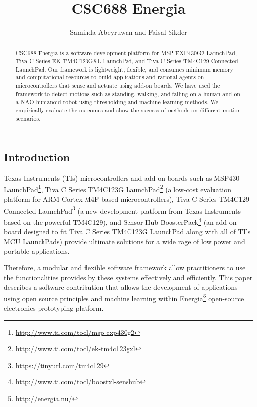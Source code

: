 \documentclass{llncs}
\begin{document}
\begin{sloppy}
\title{CSC688 Energia}
\author{Saminda Abeyruwan and Faisal Sikder}

\maketitle

\begin{abstract}
CSC688 Energia is a software development platform for MSP-EXP430G2 LaunchPad, Tiva C Series
EK-TM4C123GXL LaunchPad, and Tiva C Series TM4C129 Connected LaunchPad. Our framework is
lightweight, flexible, and consumes minimum memory and computational resources to build
applications and rational agents on microcontrollers that sense and actuate using add-on boards. We
have used the framework to detect motions such as standing, walking, and falling on a human
and on a NAO humanoid robot using thresholding and machine learning methods. We empirically
evaluate the outcomes and show the success of methods on different motion scenarios.  
\end{abstract}


\section{Introduction}

Texas Instruments (TIs) microcontrollers and add-on boards such as MSP430{\texttrademark}
LaunchPad\footnote{\url{http://www.ti.com/tool/msp-exp430g2}},
Tiva{\texttrademark} C Series TM4C123G
LaunchPad\footnote{\url{http://www.ti.com/tool/ek-tm4c123gxl}} (a low-cost evaluation platform for
ARM
Cortex-M4F-based microcontrollers), Tiva C Series TM4C129 Connected
LaunchPad\footnote{\url{https://tinyurl.com/tm4c129}} (a new
development platform from Texas Instruments
based on the powerful TM4C129), and Sensor
Hub BoosterPack\footnote{\url{http://www.ti.com/tool/boostxl-senshub}} (an add-on board designed to
fit Tiva C Series TM4C123G LaunchPad
along with all of TI’s MCU LaunchPads) provide ultimate solutions
for a wide rage of low power and portable applications.

Therefore, a modular and flexible software
framework allow practitioners to use the functionalities provides by these systems effectively
and efficiently. This paper describes a software contribution that allows the development of
applications using open source principles and machine learning within
Energia\footnote{\url{http://energia.nu/}} open-source electronics prototyping platform.


\end{sloppy}
\end{document}
